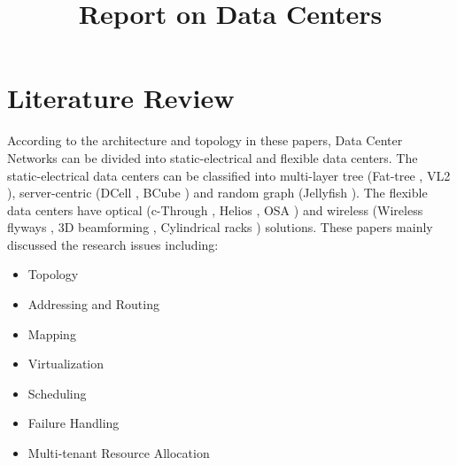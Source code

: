 \documentclass[journal,onecolumn,11pt]{IEEEtran}
\title{Report on Data Centers}
\author{\IEEEauthorblockN{Yongsen MA}
}
\begin{document}
\maketitle%

\section{Literature Review}

According to the architecture and topology in these papers, Data Center Networks can be divided into static-electrical and flexible data centers. The static-electrical data centers can be classified into multi-layer tree (Fat-tree \cite{Al-Fares:2008:SCD:1402958.1402967}, VL2 \cite{Greenberg:2009:VSF:1592568.1592576}), server-centric (DCell \cite{Guo:2008:DSF:1402958.1402968}, BCube \cite{Guo:2009:BHP:1592568.1592577}) and random graph (Jellyfish \cite{singla2012jellyfish}). The flexible data centers have optical (c-Through \cite{Wang:2010:CPO:1851182.1851222}, Helios \cite{Farrington:2010:HHE:1851182.1851223}, OSA \cite{chen2012osa}) and wireless (Wireless flyways \cite{Halperin:2011:ADC:2018436.2018442}, 3D beamforming \cite{Zhou:2012:MMC:2342356.2342440}, Cylindrical racks \cite{Shin:2012:FCW:2396556.2396560}) solutions. These papers mainly discussed the research issues including:
\begin{itemize}
  \item Topology \cite{Al-Fares:2008:SCD:1402958.1402967,Greenberg:2009:VSF:1592568.1592576,Guo:2008:DSF:1402958.1402968,Guo:2009:BHP:1592568.1592577,singla2012jellyfish}
  \item Addressing and Routing \cite{Al-Fares:2008:SCD:1402958.1402967,Greenberg:2009:VSF:1592568.1592576,Guo:2008:DSF:1402958.1402968,Guo:2009:BHP:1592568.1592577,singla2012jellyfish,NiranjanMysore:2009:PSF:1592568.1592575}
  \item Mapping \cite{Chen:2010:GAA:1851182.1851190,Greenberg:2009:VSF:1592568.1592576}
  \item Virtualization \cite{Greenberg:2009:VSF:1592568.1592576,Wang:2010:CPO:1851182.1851222,Ballani:2011:TPD:2018436.2018465,Mudigonda:2011:NSM:2018436.2018444,NiranjanMysore:2009:PSF:1592568.1592575}
  \item Scheduling \cite{Al-Fares:2008:SCD:1402958.1402967,Halperin:2011:ADC:2018436.2018442,Wang:2010:CPO:1851182.1851222,Popa:2011:FSN:2070562.2070584}
  \item Failure Handling \cite{Chen:2010:GAA:1851182.1851190,NiranjanMysore:2009:PSF:1592568.1592575,Wu:2012:NAD:2342356.2342438}
  \item Multi-tenant Resource Allocation\cite{Mudigonda:2011:NSM:2018436.2018444,Ballani:2011:TPD:2018436.2018465,Popa:2011:FSN:2070562.2070584}
\end{itemize}
\end{document}
